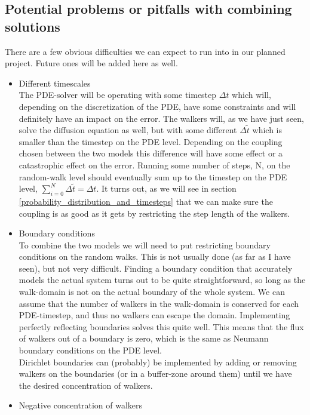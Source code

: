 \subsection{Potential problems or pitfalls with combining solutions}\label{problems_and_pitfalls}

There are a few obvious difficulties we can expect to run into in our planned project. 
Future ones will be added here as well.

\begin{itemize}
 \item Different timescales\\
  The PDE-solver will be operating with some timestep $\Delta t$ which will, depending on the discretization of the PDE, have some constraints and will definitely have an impact on the error. 
  The walkers will, as we have just seen, solve the diffusion equation as well, but with some different $\Delta \tilde{t}$ which is smaller than the timestep on the PDE level. 
  Depending on the coupling chosen between the two models this difference will have some effect or a catastrophic effect on the error. 
  Running some number of steps, N, on the random-walk level should eventually sum up to the timestep on the PDE level, $\sum\limits_{i=0}^N \Delta\tilde{t} = \Delta t$. 
  It turns out, as we will see in section \ref{probability_distribution_and_timesteps} that we can make sure the coupling is as good as it gets by restricting the step length of the walkers.
 \item Boundary conditions\\
 To combine the two models we will need to put restricting boundary conditions on the random walks. This is not usually done (as far as I have seen), but not very difficult. 
 Finding a boundary condition that accurately models the actual system turns out to be quite straightforward, so long as the walk-domain is not on the actual boundary of the whole system. 
 We can assume that the number of walkers in the walk-domain is conserved for each PDE-timestep, and thus no walkers can escape the domain. 
 Implementing perfectly reflecting boundaries solves this quite well. 
 This means that the flux of walkers out of a boundary is zero, which is the same as Neumann boundary conditions on the PDE level. \\
 Dirichlet boundaries can (probably) be implemented by adding or removing walkers on the boundaries (or in a buffer-zone around them) until we have the desired concentration of walkers.
 \item Negative concentration of walkers \\

\end{itemize}
